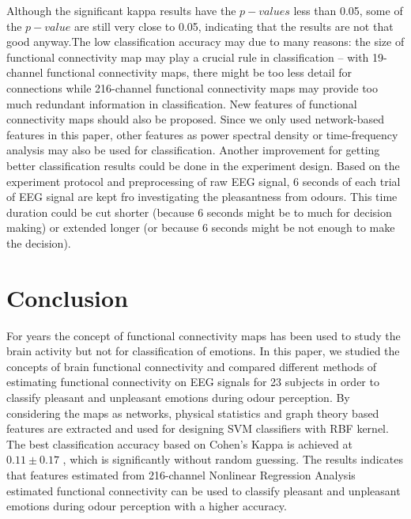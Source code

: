 \documentclass[conference]{IEEEtran}
\begin{document}
Although the significant kappa results have the $p-values$ less than 0.05, some of the $p-value$ are still very close to 0.05, indicating that the results are not that good anyway.The low classification accuracy may due to many reasons: the size of functional connectivity map may play a crucial rule in classification -- with 19-channel functional connectivity maps, there might be too less detail for connections while 216-channel functional connectivity maps may provide too much redundant information in classification. New features of functional connectivity maps should also be proposed. Since we only used network-based features in this paper, other features as power spectral density or time-frequency analysis may also be used for classification. Another improvement for getting better classification results could be done in the experiment design. Based on the experiment protocol and preprocessing of raw EEG signal, 6 seconds of each trial of EEG signal are kept fro investigating the pleasantness from odours. This time duration could be cut shorter (because 6 seconds might be to much for decision making) or extended longer (or because 6 seconds might be not enough to make the decision).


\section{Conclusion}
For years the concept of functional connectivity maps has been used to study the brain activity but not for classification of emotions. In this paper, we studied the concepts of brain functional connectivity and compared different methods of estimating functional connectivity on EEG signals for 23 subjects in order to classify pleasant and unpleasant emotions during odour perception. By considering the maps as networks, physical statistics and graph theory based features are extracted and used for designing SVM classifiers with RBF kernel. The best classification accuracy based on Cohen's Kappa is achieved at $0.11 \pm 0.17$ , which is significantly without random guessing. The results indicates that features estimated from 216-channel Nonlinear Regression Analysis estimated functional connectivity can be used to classify pleasant and unpleasant emotions during odour perception with a higher accuracy.  

\end{document}
